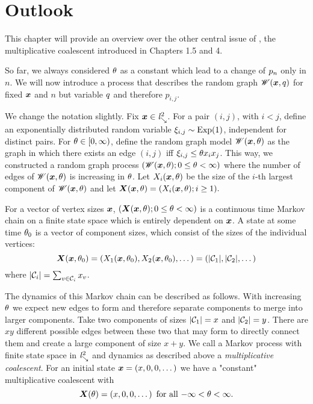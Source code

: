 
\chapter{Outlook} \label{C: outlook}

This chapter will provide an overview over the other central issue of \cite{Aldous.1997},
the multiplicative coalescent introduced in Chapters 1.5 and 4.

So far, we always considered $\theta$ as a constant which lead to a change of $p_n$ only in $n$.
We will now introduce a process that describes the random graph $\mathscr{W}(\boldsymbol{x}, q)$ for fixed $\boldsymbol{x}$ and $n$
but variable $q$ and therefore $p_{i,j}$.

We change the notation slightly.
Fix $\boldsymbol{x} \in \mathit{l}^2_{\searrow}$.
For a pair $(i,j)$, with $i < j$, 
define an exponentially distributed random variable $\xi_{i,j} \sim \operatorname*{Exp}(1)$,
independent for distinct pairs.
For $\theta \in [0, \infty)$, define the random graph model $\mathscr{W}(\boldsymbol{x}, \theta)$ as the graph in which there exists an edge $(i,j)$ 
iff $\xi_{i,j} \leq \theta x_i x_j$.
This way, we constructed a random graph process $(\mathscr{W}(\boldsymbol{x}, \theta); 0 \leq \theta < \infty)$ 
where the number of edges of $\mathscr{W}(\boldsymbol{x}, \theta)$ is increasing in $\theta$.
Let $X_i(\boldsymbol{x}, \theta)$ be the size of the $i$-th largest component of $\mathscr{W}(\boldsymbol{x}, \theta)$ and let
\begin{math}
	\boldsymbol{X}(\boldsymbol{x}, \theta) = (X_i(\boldsymbol{x}, \theta); i \geq 1).
\end{math}

For a vector of vertex sizes $\boldsymbol{x}$, $(\boldsymbol{X}(\boldsymbol{x}, \theta); 0 \leq \theta < \infty)$ is a continuous time Markov chain
on a finite state space which is entirely dependent on $\boldsymbol{x}$.
A state at some time $\theta_0$ is a vector of component sizes, which consist of the sizes of the individual vertices:
\begin{equation}
	\boldsymbol{X}(\boldsymbol{x}, \theta_0) = (X_1(\boldsymbol{x}, \theta_0), X_2(\boldsymbol{x}, \theta_0), \dots) = (|\mathcal{C}_1|, |\mathcal{C}_2|, \dots)
\end{equation}
where $|\mathcal{C}_i| = \sum_{v \in \mathcal{C}_i} x_v$.

The dynamics of this Markov chain can be described as follows.
With increasing $\theta$ we expect new edges to form and therefore separate components to merge into larger components.
Take two components of sizes $|\mathcal{C}_1| = x$ and $|\mathcal{C}_2| = y$.
There are $xy$ different possible edges between these two that may form to directly connect them 
and create a large component of size $x+y$.
We call a Markov process with finite state space in $\mathit{l}^2_{\searrow}$ and dynamics as described above a \emph{multiplicative coalescent}.
For an initial state $\boldsymbol{x} = (x, 0, 0, \dots)$ we have a "constant" multiplicative coalescent with
\begin{equation}
	\boldsymbol{X}(\theta) = (x, 0, 0, \dots) \enspace \text{for all $-\infty < \theta < \infty$}.
\end{equation}

